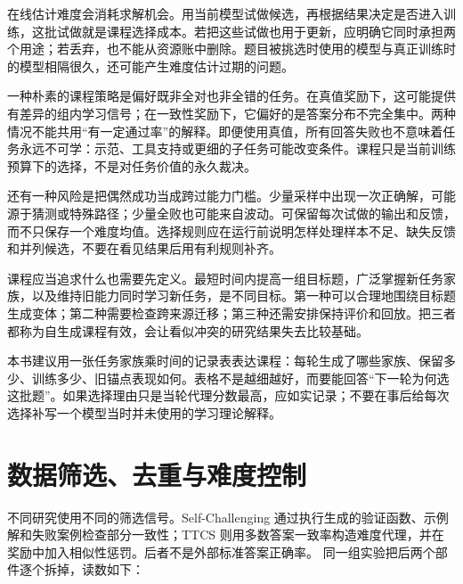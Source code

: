 在线估计难度会消耗求解机会。用当前模型试做候选，再根据结果决定是否进入训练，这批试做就是课程选择成本。若把这些试做也用于更新，应明确它同时承担两个用途；若丢弃，也不能从资源账中删除。题目被挑选时使用的模型与真正训练时的模型相隔很久，还可能产生难度估计过期的问题。

一种朴素的课程策略是偏好既非全对也非全错的任务。在真值奖励下，这可能提供有差异的组内学习信号；在一致性奖励下，它偏好的是答案分布不完全集中。两种情况不能共用“有一定通过率”的解释。即便使用真值，所有回答失败也不意味着任务永远不可学：示范、工具支持或更细的子任务可能改变条件。课程只是当前训练预算下的选择，不是对任务价值的永久裁决。

还有一种风险是把偶然成功当成跨过能力门槛。少量采样中出现一次正确解，可能源于猜测或特殊路径；少量全败也可能来自波动。可保留每次试做的输出和反馈，而不只保存一个难度均值。选择规则应在运行前说明怎样处理样本不足、缺失反馈和并列候选，不要在看见结果后用有利规则补齐。

课程应当追求什么也需要先定义。最短时间内提高一组目标题，广泛掌握新任务家族，以及维持旧能力同时学习新任务，是不同目标。第一种可以合理地围绕目标题生成变体；第二种需要检查跨来源迁移；第三种还需安排保持评价和回放。把三者都称为自生成课程有效，会让看似冲突的研究结果失去比较基础。

本书建议用一张任务家族乘时间的记录表表达课程：每轮生成了哪些家族、保留多少、训练多少、旧锚点表现如何。表格不是越细越好，而要能回答“下一轮为何选这批题”。如果选择理由只是当轮代理分数最高，应如实记录；不要在事后给每次选择补写一个模型当时并未使用的学习理论解释。


\section{数据筛选、去重与难度控制}
\label{sec:ch11-filter}

\begin{sloppypar}
不同研究使用不同的筛选信号。Self-Challenging 通过执行生成的验证函数、示例解和失败案例检查部分一致性；TTCS 则用多数答案一致率构造难度代理，并在奖励中加入相似性惩罚。后者不是外部标准答案正确率。
同一组实验把后两个部件逐个拆掉，读数如下：
\end{sloppypar}

